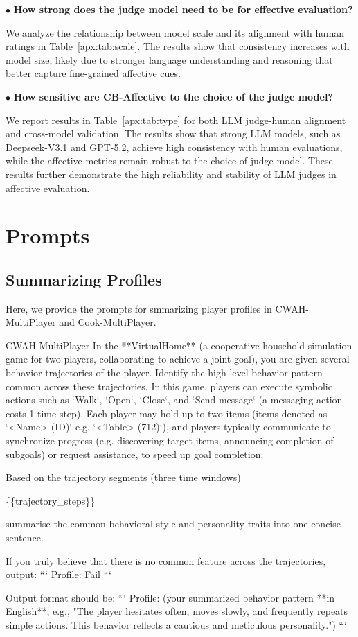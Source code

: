 \documentclass{article}
\theoremstyle{plain}
\theoremstyle{definition}
\theoremstyle{remark}
\begin{document}
$\bullet$ \textbf{How strong does the judge model need to be for effective evaluation?}

We analyze the relationship between model scale and its alignment with human ratings in Table~\ref{apx:tab:scale}. The results show that consistency increases with model size, likely due to stronger language understanding and reasoning that better capture fine-grained affective cues.

$\bullet$ \textbf{How sensitive are CB-Affective to the choice of the judge model?}

We report results in Table~\ref{apx:tab:type} for both LLM judge-human alignment and cross-model validation. The results show that strong LLM models, such as Deepseek-V3.1 and GPT-5.2, achieve high consistency with human evaluations, while the affective metrics remain robust to the choice of judge model. These results further demonstrate the high reliability and stability of LLM judges in affective evaluation.
\newpage

\section{Prompts}
\subsection{Summarizing Profiles}\label{apx:prompt_sum}
Here, we provide the prompts for smmarizing player profiles in CWAH-MultiPlayer and Cook-MultiPlayer.

\begin{myexample}{CWAH-MultiPlayer}
\ttfamily \obeylines \obeyspaces
In the **VirtualHome** (a cooperative household-simulation game for two players, collaborating to achieve a joint goal), you are given several behavior trajectories of the player. Identify the high-level behavior pattern common across these trajectories. In this game, players can execute symbolic actions such as `Walk`, `Open`, `Close`, and `Send message` (a messaging action costs 1 time step). Each player may hold up to two items (items denoted as `<Name> (ID)` e.g. `<Table> (712)`), and players typically communicate to synchronize progress (e.g. discovering target items, announcing completion of subgoals) or request assistance, to speed up goal completion.
\leavevmode\par
Based on the trajectory segments (three time windows)
\leavevmode\par
\{\{trajectory\_steps\}\}
\leavevmode\par
summarise the common behavioral style and personality traits into one concise sentence.
\leavevmode\par
If you truly believe that there is no common feature across the trajectories, output:
```
Profile: Fail
```
\leavevmode\par
Output format should be:
```
Profile: (your summarized behavior pattern **in English**, e.g., "The player hesitates often, moves slowly, and frequently repeats simple actions. This behavior reflects a cautious and meticulous personality.") 
```
\end{myexample}
\end{document}
